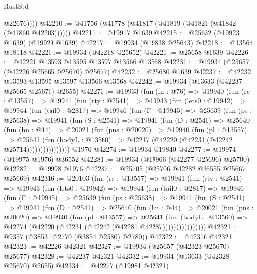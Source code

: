 \begin{lexlean}{RustStd}
\begin{coremodule}
            @22676))))
@42210 := @41756 (@41778 (@41817 (@41819 (@41821 (@41842 (@41860 @42203))))))
@42211 := @19917 @1639
@42215 := @25632 (@19923 @1639) (@19929 @1639)
@42217 := @19934 (@19838 @25643)
@42218 := @13564 @18118
@42220 := @19934 (@42218 @25652)
@42221 := @25658 @1639
@42226 := @42221 @13593 @13595 @13597 @13566 @13568
@42231 := @19934 (@25657 (@42226 @25665 @25670) @25677)
@42232 := @25680 @1639
@42237 := @42232 @13593 @13595 @13597 @13566 @13568
@42242 := @19934 (@13633 (@42237 @25665 @25670) @2655)
@42273 := @19933
    (fun (fn : @76) =>
    @19940
      (fun (rc : @13557) =>
      @19941
        (fun (rty : @2541) =>
        @19943
          (fun (lets0 : @19942) =>
          @19944
            (fun (tail0 : @2817) =>
            @19946
              (fun (Γ : @19945) =>
              @25639
                (fun (ps : @25638) =>
                @19941
                  (fun (S : @2541) =>
                  @19941
                    (fun (D : @2541) =>
                    @25640
                      (fun (hn : @44) =>
                      @20021
                        (fun (pns : @20020) =>
                        @19940
                          (fun (pl : @13557) =>
                          @25641
                            (fun (bodyL : @13560) =>
                            @42217 (@42220 (@42231 (@42242 @25714))))))))))))))))
    @1976
@42274 := @19934 @19840
@42277 := @19974 (@19975 @1976) @36552
@42281 := @19934 (@19966 (@42277 @25696) @25700)
@42282 := @19998 @1976
@42287 := @25705 (@25706 @42282 @36555 @25667 @25669)
@42316 := @20103
    (fun (rc : @13557) =>
    @19941
      (fun (rty : @2541) =>
      @19943
        (fun (lets0 : @19942) =>
        @19944
          (fun (tail0 : @2817) =>
          @19946
            (fun (Γ : @19945) =>
            @25639
              (fun (ps : @25638) =>
              @19941
                (fun (S : @2541) =>
                @19941
                  (fun (D : @2541) =>
                  @25640
                    (fun (hn : @44) =>
                    @20021
                      (fun (pns : @20020) =>
                      @19940
                        (fun (pl : @13557) =>
                        @25641
                          (fun (bodyL : @13560) =>
                          @42274 (@42220 (@42231 (@42242 (@42281 @42287))))))))))))))))
@42321 := @9357 (@3853 (@2770 (@3854 @2580) @2780))
@42322 := @42316 @42321
@42323 := @42226 @42321
@42327 := @19934 (@25657 (@42323 @25670) @25677)
@42328 := @42237 @42321
@42332 := @19934 (@13633 (@42328 @25670) @2655)
@42334 := @42277 (@19981 @42321)

\end{coremodule}
\end{lexlean}
